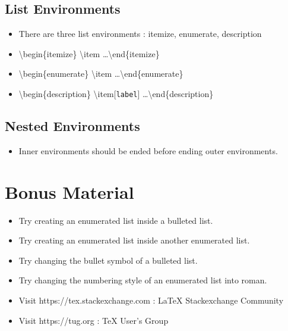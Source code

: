 \documentclass{article}
\begin{document}
\subsection{List Environments}
\begin{itemize}
	\item There are three list environments : itemize, enumerate, description
	\item \textbackslash{}begin\{itemize\} \textbackslash{}item \dots \textbackslash{}end\{itemize\}
	\item \textbackslash{}begin\{enumerate\} \textbackslash{}item \dots \textbackslash{}end\{enumerate\}
	\item \textbackslash{}begin\{description\} \textbackslash{}item[\texttt{label}] \dots \textbackslash{}end\{description\}
\end{itemize}

\subsection*{Nested Environments}
\begin{itemize}
	\item Inner environments should be ended before ending outer environments.
\end{itemize}

\section{Bonus Material}
\begin{itemize}
	\item Try creating an enumerated list inside a bulleted list.
	\item Try creating an enumerated list inside another enumerated list.
	\item Try changing the bullet symbol of a bulleted list.
	\item Try changing the numbering style of an enumerated list into roman.
	\item Visit https://tex.stackexchange.com : \LaTeX{} Stackexchange Community
	\item Visit https://tug.org : \TeX{} User's Group
\end{itemize}


%
%
\end{document}
